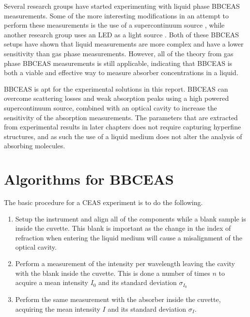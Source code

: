 Several research groups have started experimenting with liquid phase
\ac{BBCEAS} measurements. Some of the more interesting modifications in an
attempt to perform these measurements is the use of a supercontinuum source
\cite{Kiwanuka:2010bj}, while another research group uses an \ac{LED} as a
light source \cite{Islam:2007ea,Seetohul:2009ij,Seetohul:2009du}. Both of
these \ac{BBCEAS} setups have shown that liquid measurements are more complex
and have a lower sensitivity than gas phase measurements. However, all of the
theory from gas phase \ac{BBCEAS} measurements is still applicable, indicating
that \ac{BBCEAS} is both a viable and effective way to measure absorber
concentrations in a liquid.

\ac{BBCEAS} is apt for the experimental solutions in this report. \ac{BBCEAS}
can overcome scattering losses and weak absorption peaks using a high powered
supercontinuum source, combined with an optical cavity to increase the
sensitivity of the absorption measurements. The parameters that are extracted
from experimental results in later chapters does not require capturing
hyperfine structures, and as such the use of a liquid medium does not alter
the analysis of absorbing molecules.



\section{Algorithms for BBCEAS}


The basic procedure for a CEAS experiment is to do the following.

\begin{enumerate}
  \item Setup the instrument and align all of the components while a blank
        sample is inside the cuvette. This blank is important as the change in
        the index of refraction when entering the liquid medium will cause a
        misalignment of the optical cavity.
  \item Perform a measurement of the intensity per wavelength leaving the
        cavity with the blank inside the cuvette. This is done a number of
        times $n$ to acquire a mean intensity $I_0$ and its standard deviation
        $\sigma_{I_0}$
  \item Perform the same measurement with the absorber inside the cuvette,
        acquiring the mean intensity $I$ and its standard deviation
        $\sigma_{I}$.
\end{enumerate}

